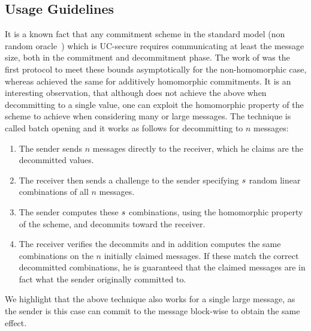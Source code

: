 
\subsection{Usage Guidelines}
It is a known fact that any commitment scheme in the standard model (non random oracle~\cite{DBLP:conf/ccs/BellareR93}) which is UC-secure \cite{DBLP:conf/focs/Canetti01} requires communicating at least the message size, both in the commitment and decommitment phase. The work of \cite{DBLP:conf/eurocrypt/GarayIKW14} was the first protocol to meet these bounds asymptotically for the non-homomorphic case, whereas \cite{DBLP:conf/tcc/FrederiksenJNT16} achieved the same for additively homomorphic commitments. It is an interesting observation, that although \cite{DBLP:conf/tcc/FrederiksenJNT16} does not achieve the above when decommitting to a single value, one can exploit the homomorphic property of the scheme to achieve when considering many or large messages. The technique is called batch opening and it works as follows for decommitting to $n$ messages:
\begin{enumerate}
  \item The sender sends $n$ messages directly to the receiver, which he claims are the decommitted values.
  \item The receiver then sends a challenge to the sender specifying $s$ random linear combinations of all $n$ messages.
  \item The sender computes these $s$ combinations, using the homomorphic property of the scheme, and decommits toward the receiver.
  \item The receiver verifies the decommits and in addition computes the same combinations on the $n$ initially claimed messages. If these match the correct decommitted combinations, he is guaranteed that the claimed messages are in fact what the sender originally committed to.
\end{enumerate}

We highlight that the above technique also works for a single large message, as the sender is this case can commit to the message block-wise to obtain the same effect.


